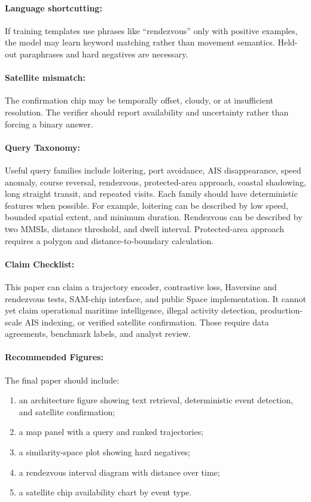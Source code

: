 \documentclass{article}
\begin{document}
\paragraph{Language shortcutting:}
If training templates use phrases like ``rendezvous'' only with positive examples, the model may learn keyword matching rather than movement semantics. Held-out paraphrases and hard negatives are necessary.

\paragraph{Satellite mismatch:}
The confirmation chip may be temporally offset, cloudy, or at insufficient resolution. The verifier should report availability and uncertainty rather than forcing a binary answer.

\paragraph{Query Taxonomy:}

Useful query families include loitering, port avoidance, AIS disappearance, speed anomaly, course reversal, rendezvous, protected-area approach, coastal shadowing, long straight transit, and repeated visits. Each family should have deterministic features when possible. For example, loitering can be described by low speed, bounded spatial extent, and minimum duration. Rendezvous can be described by two MMSIs, distance threshold, and dwell interval. Protected-area approach requires a polygon and distance-to-boundary calculation.

\paragraph{Claim Checklist:}

This paper can claim a trajectory encoder, contrastive loss, Haversine and rendezvous tests, SAM-chip interface, and public Space implementation. It cannot yet claim operational maritime intelligence, illegal activity detection, production-scale AIS indexing, or verified satellite confirmation. Those require data agreements, benchmark labels, and analyst review.

\paragraph{Recommended Figures:}

The final paper should include:
\begin{enumerate}
  \item an architecture figure showing text retrieval, deterministic event detection, and satellite confirmation;
  \item a map panel with a query and ranked trajectories;
  \item a similarity-space plot showing hard negatives;
  \item a rendezvous interval diagram with distance over time;
  \item a satellite chip availability chart by event type.
\end{enumerate}
\end{document}
